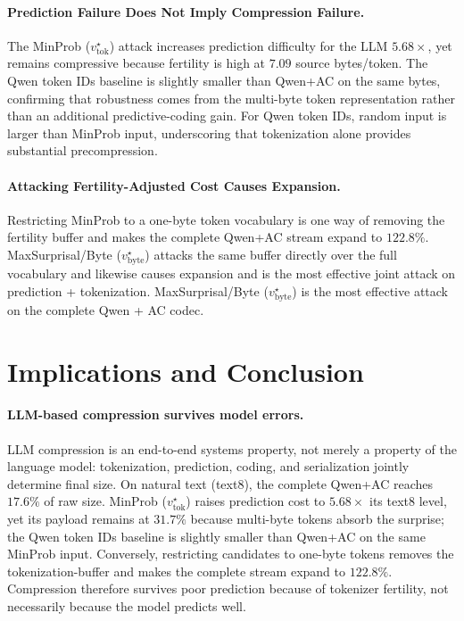 \documentclass{article}
\newcommand{\vtok}{v^\star_{\mathrm{tok}}}
\newcommand{\vbyte}{v^\star_{\mathrm{byte}}}
\begin{document}

\paragraph{Prediction Failure Does Not Imply Compression Failure.}
The MinProb ($\vtok$) attack increases prediction difficulty for the LLM $5.68\times$, yet remains
compressive because fertility is high at $7.09$ source bytes/token. The Qwen token IDs baseline is slightly smaller than Qwen+AC on the same bytes, confirming that
robustness comes from the multi-byte token representation rather than an
additional predictive-coding gain. For Qwen token IDs, random input is larger
than MinProb input, underscoring that tokenization alone provides substantial precompression.

\paragraph{Attacking Fertility-Adjusted Cost Causes Expansion.}
Restricting MinProb to a one-byte token vocabulary is one way of removing the fertility buffer and makes
the complete Qwen+AC stream expand to $122.8\%$. MaxSurprisal/Byte ($\vbyte$)
attacks the same buffer directly over the full vocabulary and likewise causes
expansion and is the most effective joint attack on prediction + tokenization. MaxSurprisal/Byte ($\vbyte$)
is the most effective attack on the complete Qwen + AC codec.



\section{Implications and Conclusion }
\label{sec:limitations}

\paragraph{LLM-based compression survives model errors.}LLM compression is an end-to-end systems property, not merely a property of the language model: tokenization, prediction,
coding, and serialization jointly determine final size. On natural text (text8), the complete Qwen+AC reaches $17.6\%$ of raw size. MinProb ($\vtok$) raises
prediction cost to $5.68\times$ its text8 level, yet its payload remains at
$31.7\%$ because multi-byte tokens absorb the surprise; the Qwen token IDs baseline
is slightly smaller than Qwen+AC on the same MinProb input. Conversely, restricting
candidates to one-byte tokens removes the tokenization-buffer and makes the complete stream
expand to $122.8\%$. Compression therefore survives poor prediction because of
tokenizer fertility, not necessarily because the model predicts well.
\end{document}
